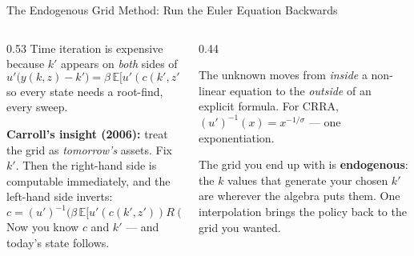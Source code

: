 \begin{frame}{The Endogenous Grid Method: Run the Euler Equation Backwards}
\begin{columns}[T]
\begin{column}{0.53\textwidth}
\small
Time iteration is expensive because $k'$ appears on \emph{both} sides of
\[
  u'\big(y(k,z)-k'\big)=\beta\,\mathbb{E}\big[u'(c(k',z'))R(k',z')\big],
\]
so every state needs a root-find, every sweep.
\medskip

\textbf{Carroll's insight (2006):} treat the grid as \emph{tomorrow's} assets. Fix $k'$. Then the right-hand side is computable immediately, and the left-hand side inverts:
\[
  c=(u')^{-1}\Big(\beta\,\mathbb{E}\big[u'(c(k',z'))R(k',z')\big]\Big).
\]
Now you know $c$ and $k'$ --- and today's state follows.
\end{column}
\begin{column}{0.44\textwidth}
\begin{conceptbox}[title=\textbf{The trade}]\small
The unknown moves from \emph{inside} a non-linear equation to the \emph{outside} of an explicit formula. For CRRA, $(u')^{-1}(x)=x^{-1/\sigma}$ --- one exponentiation.
\end{conceptbox}
\medskip
\begin{examplebox}\footnotesize
The grid you end up with is \textbf{endogenous}: the $k$ values that generate your chosen $k'$ are wherever the algebra puts them. One interpolation brings the policy back to the grid you wanted.
\end{examplebox}
\end{column}
\end{columns}
\vspace{1mm}
\end{frame}

